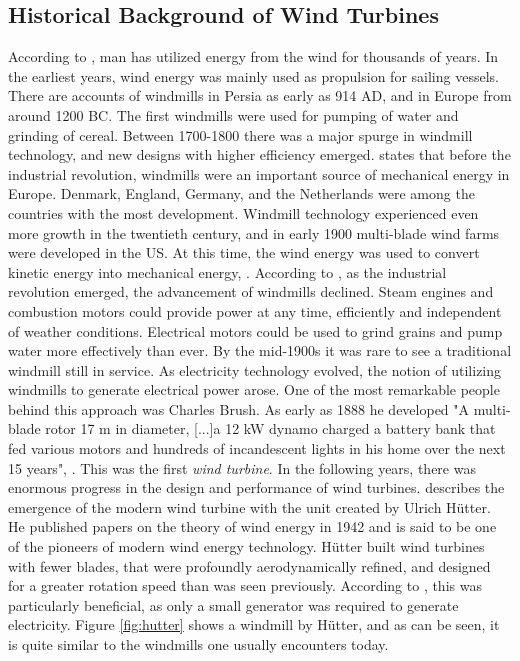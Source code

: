 \subsection{Historical Background of Wind Turbines}
According to \cite{Wagner2013}, man has utilized energy from the wind for thousands of years. In the earliest years, wind energy was mainly used as propulsion for sailing vessels. There are accounts of windmills in Persia as early as 914 AD, and in Europe from around 1200 BC. The first windmills were used for pumping of water and grinding of cereal. Between 1700-1800 there was a major spurge in windmill technology, and new designs with higher efficiency emerged. \cite{Lynn2011} states that before the industrial revolution, windmills were an important source of mechanical energy in Europe. Denmark, England, Germany, and the Netherlands were among the countries with the most development. Windmill technology experienced even more growth in the twentieth century, and in early 1900 multi-blade wind farms were developed in the US. At this time, the wind energy was used to convert kinetic energy into mechanical energy, \cite{Hau2013}. According to \cite{Lynn2011}, as the industrial revolution emerged, the advancement of windmills declined. Steam engines and combustion motors could provide power at any time, efficiently and independent of weather conditions. Electrical motors could be used to grind grains and pump water more effectively than ever. By the mid-1900s it was rare to see a traditional windmill still in service. \newline 
\newline
As electricity technology evolved, the notion of utilizing windmills to generate electrical power arose. One of the most remarkable people behind this approach was Charles Brush. As early as 1888 he developed "A multi-blade rotor 17 m in diameter, [...]a 12 kW dynamo charged a battery bank that fed various motors and hundreds of incandescent lights in his home over the next 15 years", \cite{Lynn2011}. This was the first \textit{wind turbine}. In the following years, there was enormous progress in the design and performance of wind turbines. \cite{Hau2013} describes the emergence of the modern wind turbine with the unit created by Ulrich Hütter. He published papers on the theory of wind energy in 1942 and is said to be one of the pioneers of modern wind energy technology. Hütter built wind turbines with fewer blades, that were profoundly aerodynamically refined, and designed for a greater rotation speed than was seen previously. According to \cite{Wagner2013}, this was particularly beneficial, as only a small generator was required to generate electricity. Figure \ref{fig:hutter} shows a windmill by Hütter, and as can be seen, it is quite similar to the windmills one usually encounters today. \newline
\newline

